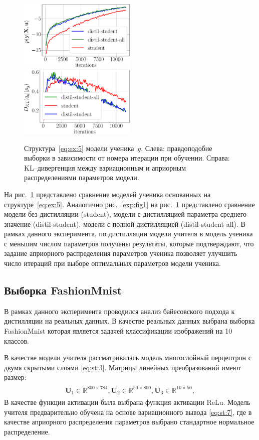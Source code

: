 \documentclass[12pt]{a&t}
\begin{document}
\begin{figure}[h!]
\includegraphics[width=0.5\textwidth]{synthetic_likelihood_2_layers.eps}
\includegraphics[width=0.5\textwidth]{synthetic_D_KL_2_layers.eps}
\caption{Структура~\eqref{eq:ex:5} модели ученика~$g$. Слева: правдоподобие выборки в зависимости от номера итерации при обучении. Справа: KL--дивергенция между вариационным и априорным распределениями параметров модели.}
\label{exp:fig2}
\end{figure}

На рис.~\ref{exp:fig2} представлено сравнение моделей ученика основанных на структуре~\eqref{eq:ex:5}. Аналогично рис.~\ref{exp:fig1} на рис.~\ref{exp:fig2} представлено сравнение модели без дистилляции (student), модели с дистилляцией параметра среднего значение (distil-student), модели с полной дистилляцией (distil-student-all). В рамках данного эксперимента, по дистилляции модели учителя в модель ученика с меньшим числом параметров получены результаты, которые подтверждают, что задание априорного распределения параметров ученика позволяет улучшить число итераций при выборе оптимальных параметров модели ученика.

\subsection{Выборка FashionMnist}

В рамках данного эксперимента проводился анализ байесовского подхода к дистилляции на реальных данных.  В качестве реальных данных выбрана выборка FashionMnist\cite{fashionmnist} которая является задачей классификации изображений на 10 классов.

В качестве модели учителя рассматривалась модель многослойный перцептрон с двумя скрытыми слоями \eqref{eq:st:3}. Матрицы линейных преобразований имеют размер:
\begin{gather}
\label{eq:ex:7}
\begin{aligned}
\mathbf{U}_{1} \in \mathbb{R}^{800 \times 784}, \mathbf{U}_{2} \in \mathbb{R}^{50 \times 800},  \mathbf{U}_{3} \in \mathbb{R}^{10 \times 50},
\end{aligned}
\end{gather}
В качестве функции активации была выбрана функция активации $\text{ReLu}$.
Модель учителя предварительно обучена на основе вариационного вывода \eqref{eq:st:7}, где в качестве априорного распределения параметров выбрано стандартное нормальное распределение.
\end{document}
